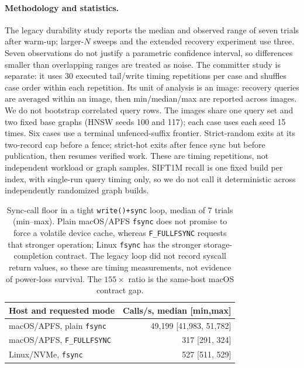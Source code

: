 \documentclass[sigconf,nonacm,balance=false]{acmart}
\newcommand{\fullfsync}{\texttt{F\_FULLFSYNC}}
\newcommand{\fsync}{\texttt{fsync}}
\begin{document}
\paragraph{Methodology and statistics.} The legacy durability study reports the
median and observed range of seven trials after warm-up; larger-$N$ sweeps and the
extended recovery experiment use three. Seven observations do not justify a
parametric confidence interval, so differences smaller than overlapping ranges
are treated as noise. The committer study is separate: it uses 30 executed
tail/write timing repetitions per case and shuffles case order within each repetition.
Its unit of analysis is an image: recovery queries are averaged within an image,
then min/median/max are reported across images. We do not bootstrap correlated
query rows. The images share one query set and two fixed base graphs (HNSW seeds
100 and 117); each case uses each seed 15 times. Six cases use a terminal
unfenced-suffix frontier. Strict-random exits at its two-record cap before a
fence; strict-hot exits after fence sync but before publication, then resumes
verified work. These are timing repetitions, not independent workload or graph
samples. SIFT1M recall is one fixed build per index, with single-run query
timing only, so we do not call it deterministic across independently randomized
graph builds.

\begin{table}[t]
\centering
\caption{Sync-call floor in a tight \texttt{write()+sync} loop, median of 7 trials
(min--max). Plain macOS/APFS \fsync{} does not promise to force a volatile device
cache, whereas \fullfsync{} requests that stronger operation; Linux \fsync{} has
the stronger storage-completion contract. The legacy loop did not record syscall
return values, so these are timing measurements, not evidence of power-loss
survival. The $155\times$ ratio is the same-host macOS contract gap.}
\label{tab:floor}
\small
\begin{tabular}{@{}lr@{}}
\toprule
Host and requested mode & Calls/s, median [min,max] \\
\midrule
macOS/APFS, plain \fsync{} & 49{,}199 [41{,}983, 51{,}782] \\
macOS/APFS, \fullfsync{} & 317 [291, 324] \\
Linux/NVMe, \fsync{} & 527 [511, 529] \\
\bottomrule
\end{tabular}
\end{table}
\end{document}
